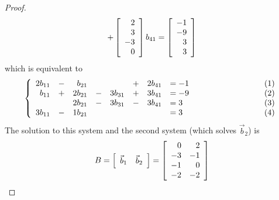 \documentclass{tutorial}
\begin{document}
\begin{proof}
\[    + \left[ \begin{array}{r} 2 \\ 3 \\-3 \\ 0 \end{array} \right] b_{41}
    = \left[ \begin{array}{r}-1 \\-9 \\ 3 \\ 3 \end{array} \right]
\]
which is equivalent to
\[
	\lb \begin{array}{rcrcrcrlp{1in}l}
		 2b_{11} &-&  b_{21} & &         &+& 2b_{41} &=-1 &\mbox{}& (1) \\
		  b_{11} &+& 2b_{21} &-& 3b_{31} &+& 3b_{41} &=-9 &\mbox{}& (2) \\
		         & & 2b_{21} &-& 3b_{31} &-& 3b_{41} &= 3 &\mbox{}& (3) \\
		 3b_{11} &-& 1b_{21} & &         & &         &= 3 &\mbox{}& (4)
	\end{array} \right.
\]
The solution to this system and the second system (which solves $\vec{b}_2$) is
\[
    B = \left[ \begin{array}{c|c} \vec{b}_1 & \vec{b}_2 \end{array} \right]
      = \left[ \begin{array}{rr}
         0& 2\\
        -3&-1\\
        -1& 0\\
        -2&-2
      \end{array} \right]
\]
\end{proof}\else \newpage \fi
\end{document}
